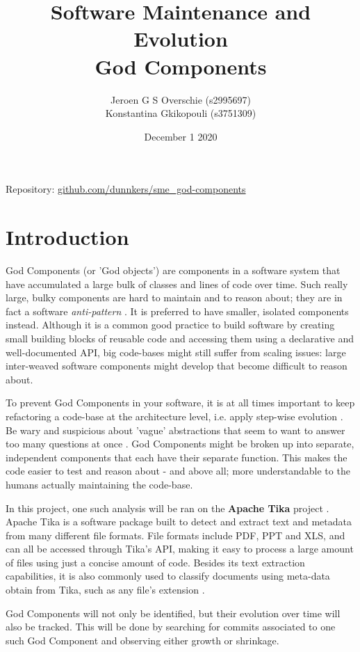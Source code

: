 \documentclass{article}
\title{Software Maintenance and Evolution \\God Components}
\author{Jeroen G S Overschie (s2995697)\\ Konstantina Gkikopouli (s3751309)}
\date{December 1 2020}
\begin{document}
\maketitle
Repository: \small{\url{github.com/dunnkers/sme_god-components}}
\tableofcontents
\newpage

\section{Introduction}
God Components (or 'God objects') are components in a software system that have accumulated a large bulk of classes and lines of code over time. Such really large, bulky components are hard to maintain and to reason about; they are in fact a software \textit{anti-pattern} \citep{smith2000software}. It is preferred to have smaller, isolated components instead. Although it is a common good practice to build software by creating small building blocks of reusable code and accessing them using a declarative and well-documented API, big code-bases might still suffer from scaling issues: large inter-weaved software components might develop that become difficult to reason about.

To prevent God Components in your software, it is at all times important to keep refactoring a code-base at the architecture level, i.e. apply step-wise evolution \citep{toward_a_catalogue_of_architetural_bad_smells}. Be wary and suspicious about 'vague' abstractions that seem to want to answer too many questions at once \citep{riel1996object}. God Components might be broken up into separate, independent components that each have their separate function. This makes the code easier to test and reason about - and above all; more understandable to the humans actually maintaining the code-base.

In this project, one such analysis will be ran on the \textbf{Apache Tika} project \citep{apache_software_foundation_2020}. Apache Tika is a software package built to detect and extract text and metadata from many different file formats. File formats include PDF, PPT and XLS, and can all be accessed through Tika's API, making it easy to process a large amount of files using just a concise amount of code. Besides its text extraction capabilities, it is also commonly used to classify documents using meta-data obtain from Tika, such as any file's extension \citep{Tika}.

God Components will not only be identified, but their evolution over time will also be tracked. This will be done by searching for commits associated to one such God Component and observing either growth or shrinkage.
\end{document}
